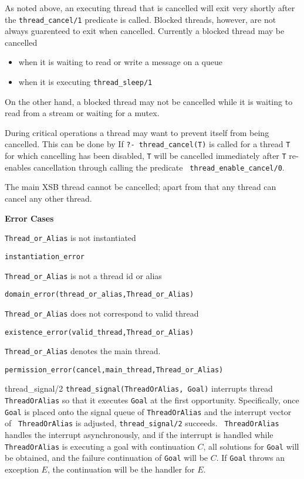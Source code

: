 \begin{description}
As noted above, an executing thread that is cancelled will exit very
shortly after the {\tt thread\_cancel/1} predicate is called.  Blocked
threads, however, are not always guarenteed to exit when cancelled.
Currently a blocked thread may be cancelled
%
\begin{itemize}
%
\item when it is waiting to read or write a message on a queue
%
\item when it is executing {\tt thread\_sleep/1}
%
\end{itemize}
%
On the other hand, a blocked thread may not be cancelled while it is
waiting to read from a stream or waiting for a mutex.

During critical operations a thread may want to prevent itself from
being cancelled.  This can be done by If {\tt ?- thread\_cancel(T)} is
called for a thread {\tt T} for which cancelling has been disabled,
{\tt T} will be cancelled immediately after {\tt T} re-enables
cancellation through calling the predicate {\tt
  thread\_enable\_cancel/0}.

The main XSB thread cannot be cancelled; apart from that any thread
can cancel any other thread.

{\bf Error Cases}
\bi
\item 	{\tt Thread\_or\_Alias} is not instantiated
\bi
\item 	{\tt instantiation\_error}
\ei
%
\item 	{\tt Thread\_or\_Alias} is not a thread id or alias
\bi
\item 	{\tt domain\_error(thread\_or\_alias,Thread\_or\_Alias)}
\ei
%
\item   {\tt Thread\_or\_Alias} does not correspond to valid thread
\bi
\item   {\tt existence\_error(valid\_thread,Thread\_or\_Alias)}
\ei
\item   {\tt Thread\_or\_Alias} denotes the main thread.
\bi
\item   {\tt permission\_error(cancel,main\_thread,Thread\_or\_Alias)}
\ei
\ei

{thread\_signal/2}
% 
{\tt thread\_signal(ThreadOrAlias, Goal)} interrupts thread {\tt
  ThreadOrAlias} so that it executes {\tt Goal} at the first
opportunity.  Specifically, once {\tt Goal} is placed onto the signal
queue of {\tt ThreadOrAlias} and the interrupt vector of {\tt
  ThreadOrAlias} is adjusted, {\tt thread\_signal/2} succeeds.  {\tt
  ThreadOrAlias} handles the interrupt asynchronously, and if the
interrupt is handled while {\tt ThreadOrAlias} is executing a goal
with continuation $C$, all solutions for {\tt Goal} will be obtained,
and the failure continuation of {\tt Goal} will be $C$.  If {\tt Goal}
throws an exception $E$, the continuation will be the handler for $E$.


\end{description}
